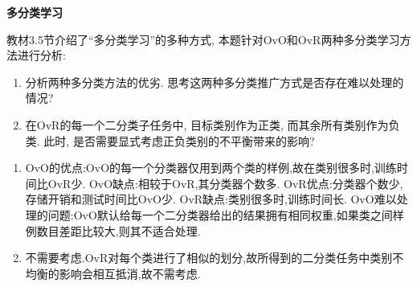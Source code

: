 \documentclass[answers]{exam}  %
\begin{document}
\begin{questions}
	\question [20] \textbf{多分类学习}

	教材3.5节介绍了“多分类学习”的多种方式, 本题针对OvO和OvR两种多分类学习方法进行分析:
	\begin{enumerate}
		\item 分析两种多分类方法的优劣. 思考这两种多分类推广方式是否存在难以处理的情况?
		\item 在OvR的每一个二分类子任务中, 目标类别作为正类, 而其余所有类别作为负类. 此时, 是否需要显式考虑正负类别的不平衡带来的影响?
	\end{enumerate}
	\begin{solution}
		\begin{enumerate}
			\item OvO的优点:OvO的每一个分类器仅用到两个类的样例,故在类别很多时,训练时间比OvR少.
			      OvO缺点:相较于OvR,其分类器个数多.
			      OvR优点:分类器个数少,存储开销和测试时间比OvO少.
			      OvR缺点:类别很多时,训练时间长.
			      OvO难以处理的问题:OvO默认给每一个二分类器给出的结果拥有相同权重,如果类之间样例数目差距比较大,则其不适合处理.
			\item 不需要考虑.OvR对每个类进行了相似的划分,故所得到的二分类任务中类别不均衡的影响会相互抵消,故不需考虑.
		\end{enumerate}
	\end{solution}

\end{questions}
\end{document}
